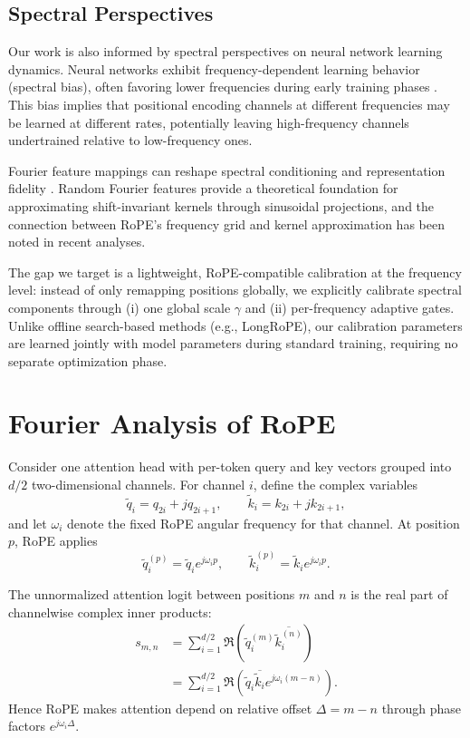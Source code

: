 \documentclass[conference]{IEEEtran}
\begin{document}
\subsection{Spectral Perspectives}
Our work is also informed by spectral perspectives on neural network learning dynamics. Neural networks exhibit frequency-dependent learning behavior (spectral bias), often favoring lower frequencies during early training phases \cite{rahaman2019spectral}. This bias implies that positional encoding channels at different frequencies may be learned at different rates, potentially leaving high-frequency channels undertrained relative to low-frequency ones.

Fourier feature mappings can reshape spectral conditioning and representation fidelity \cite{tancik2020fourier}. Random Fourier features \cite{rahimi2007random} provide a theoretical foundation for approximating shift-invariant kernels through sinusoidal projections, and the connection between RoPE's frequency grid and kernel approximation has been noted in recent analyses.

The gap we target is a lightweight, RoPE-compatible calibration at the frequency level: instead of only remapping positions globally, we explicitly calibrate spectral components through (i) one global scale $\gamma$ and (ii) per-frequency adaptive gates. Unlike offline search-based methods (e.g., LongRoPE), our calibration parameters are learned jointly with model parameters during standard training, requiring no separate optimization phase.

\section{Fourier Analysis of RoPE}
Consider one attention head with per-token query and key vectors grouped into $d/2$ two-dimensional channels. For channel $i$, define the complex variables
\begin{equation}
\tilde q_i = q_{2i} + j q_{2i+1}, \qquad \tilde k_i = k_{2i} + j k_{2i+1},
\end{equation}
and let $\omega_i$ denote the fixed RoPE angular frequency for that channel. At position $p$, RoPE applies
\begin{equation}
\tilde q_i^{(p)} = \tilde q_i e^{j\omega_i p}, \qquad
\tilde k_i^{(p)} = \tilde k_i e^{j\omega_i p}.
\end{equation}

The unnormalized attention logit between positions $m$ and $n$ is the real part of channelwise complex inner products:
\begin{align}
s_{m,n}
&= \sum_{i=1}^{d/2} \Re\!\left(\tilde q_i^{(m)} \overline{\tilde k_i^{(n)}}\right) \\
&= \sum_{i=1}^{d/2} \Re\!\left(\tilde q_i \overline{\tilde k_i} e^{j\omega_i(m-n)}\right).
\label{eq:rope_rel_phase}
\end{align}
Hence RoPE makes attention depend on relative offset $\Delta=m-n$ through phase factors $e^{j\omega_i\Delta}$.
\end{document}
